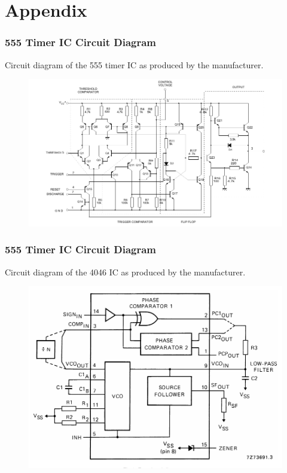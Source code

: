 \part*{Appendix}

\appendix

\section{555 Timer IC Circuit Diagram}
\label{app:555}
Circuit diagram of the 555 timer IC as produced by the manufacturer\cite{NE555}.
\begin{figure}[h!]
	\begin{center}
		\includegraphics[scale=0.9]{report_img/555_crop}
	\end{center}
\end{figure}

\section{555 Timer IC Circuit Diagram}
\label{app:4046}
Circuit diagram of the 4046 IC as produced by the manufacturer\cite{HEF4046B}.
\begin{figure}[h!]
	\begin{center}
		\includegraphics[scale=0.6]{report_img/4046_crop}
	\end{center}
\end{figure}

